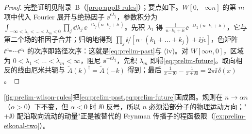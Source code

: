 \begin{proof}
完整证明见附录~B（\cref{prop:appB-rules}）；要点如下。$W[0,-\infty n]$ 的第 $m$ 项中代入 Fourier 展开与绝热因子 $\ee^{\epsilon\lambda_j}$，参数积分为 $\int_{-\infty<\lambda_1<\dots<\lambda_m<0}\prod_j\dd\lambda_j\,\ee^{-\ii\lambda_j(n\cdot k_j+\ii\epsilon)}$。先积 $\lambda_1$ 得 $\frac{\ii}{n\cdot k_1+\ii\epsilon}\ee^{-\ii\lambda_2(n\cdot k_1+\ii\epsilon)}$，它与第二个场的相因子合并；归纳地得到 $\prod_j\ii/[n\cdot(k_1+\dots+k_j)+\ii j\epsilon]$，色矩阵 $t^{a_m}\cdots t^{a_1}$ 的次序即路径次序：这就是\cref{eq:prelim-past}与 (iv)。对 $W[\infty n,0]$，区域为 $0<\lambda_1<\dots<\lambda_m<\infty$，阻尼 $\ee^{-\epsilon\lambda_j}$，先积 $\lambda_m$ 即得\cref{eq:prelim-future}。取向相反的线由厄米共轭与 $\tilde A(k)^\dagger=\tilde A(-k)$ 得到；最后 $\frac1{x-\ii0}-\frac1{x+\ii0}=2\pi\ii\,\delta(x)$。
\end{proof}

\cref{fig:prelim-wilson-rules}把\cref{eq:prelim-past,eq:prelim-future}画成图。规则在 $n\to\alpha n$（$\alpha>0$）下不变，但 $\alpha<0$ 时 $\ii0$ 反号，所以 $n$ 必须沿部分子的物理运动方向；"$+\ii0$ 配沿取向流动的动量"正是被替代的 Feynman 传播子的程函极限（\cref{ex:prelim-eikonal-two}）。

